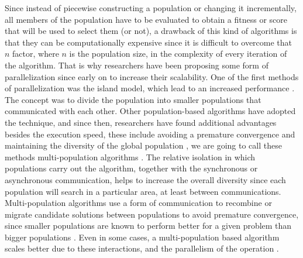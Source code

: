 Since instead of piecewise constructing a population or changing it
incrementally, all members of the population have to be evaluated to
obtain a fitness or score that will be used to select them (or not), a
drawback of this kind of algorithms is that they can be computationally
expensive since it is difficult to overcome that $n$ factor, where $n$
is the population size, in the complexity of every iteration of the
algorithm. That is why researchers have been proposing some form of
parallelization since early on \cite{muhlenbein1988evolution} to
increase their scalability. %
One of the first methods of parallelization was the island
model, which lead to an increased performance
\cite{gorges1990explicit,grosso1985computer}. The concept was to divide the
population into smaller populations that communicated with each other. Other
population-based algorithms have adopted the technique, and since then,
researchers have found additional advantages besides the execution speed, 
these include avoiding a premature convergence and maintaining the diversity of the
global population \cite{li2015multi}, we are going to call these methods 
multi-population algorithms \cite{Ma2019}. The relative 
isolation in which populations carry out the algorithm, together with the
synchronous or asynchronous communication, helps to increase the overall
diversity since each population will search in a particular area, at least
between communications. Multi-population algorithms use a form of
communication to recombine or migrate candidate solutions between populations
to avoid premature convergence, since smaller populations are known to perform
better for a given problem than bigger populations
\cite{li2016multi,wu2016differential}.  Even in some cases, a multi-population based
algorithm scales better due to these interactions, and the parallelism of the
operation \cite{ALBA20027}. 

